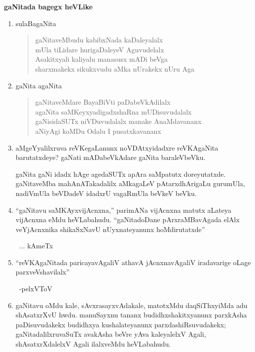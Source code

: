 \begin{center}
{\bf gaNitada bagegx heVLike} 
\end{center}
\begin{enumerate}[\rm 1)]
\item sulaBagaNita
\begin{center} 
\begin{verse}
gaNitaveMbudu kabibxNada kaDaleyalalx\\
mUla tiLidare hurigaDaleyeV Aguvudelalx\\
Asakitxyali kaliyalu manasusx mADi beVga\\
sharxmakekx sikukxvudu aMka nUrakekx nUru Aga
\end{verse}
\end{center}

\item gaNita agaNita
\begin{center} 
\begin{verse}
gaNitaveMdare BayaBiVti paDabeVkAdilalx\\
agaNita saMKeyxyadigadxshaRna mUDisuvudalalx\\
gaNisidaSUTx niVDuvudalalx manake AnaMdavananx\\
aNiyAgi koMDu Odalu I pusatxkavananx
\end{verse}
\end{center}

\item aMgeYyalilxruva reVKegaLanunx noVDAtxyidadxre reVKAgaNita barutatxdeye? gaNati mADabeVkAdare gaNita baraleVbeVku.

gaNita gaNi idadx hAge agedaSUTx apAra saMpatutx doreyutatxde. gaNitaveMba mahAnATakadalilx aMkagaLeV pAtarxdhArigaLu gurumUla, nadiVmUla beVDadeV idadxrU vagaRmUla beVkeV beVku.

\item  ``gaNitavu saMKAyxvijAcnxna,'' parimANa vijAcnxna matutx aLateya vijAcnxna eMdu heVLabahudu. ``gaNitadoDane pArxraMBavAgada elAlx veYjAcnxnika shikaSxNavU nUyxnateyanunx hoMdirutatxde''

~\hfill $\ldots$  kAmeTx

\item ``reVKAgaNitada paricayavAgaliV athavA jAcnxnavAgaliV iradavarige oLage parxveVshavilalx''

~\hfill -pelxVToV

\item gaNitavu oMdu kale, sAvxrasayxvAdakale, matotxMdu daqSiThxyiMda adu shAsatxrXvU hwdu. manuSayxnu tananx budidhxshakitxyanunx parxkAsha paDisuvudakekx budidhxya kushalate\-yanunx parxdashiRsuvudakekx; gaNitadalilxruvaSuTx avakAsha beVre yAva kaleyalelxV Agali, shAsatxrXdalelxV Agali ilalxveMdu heVLabahudu.


\end{enumerate}
